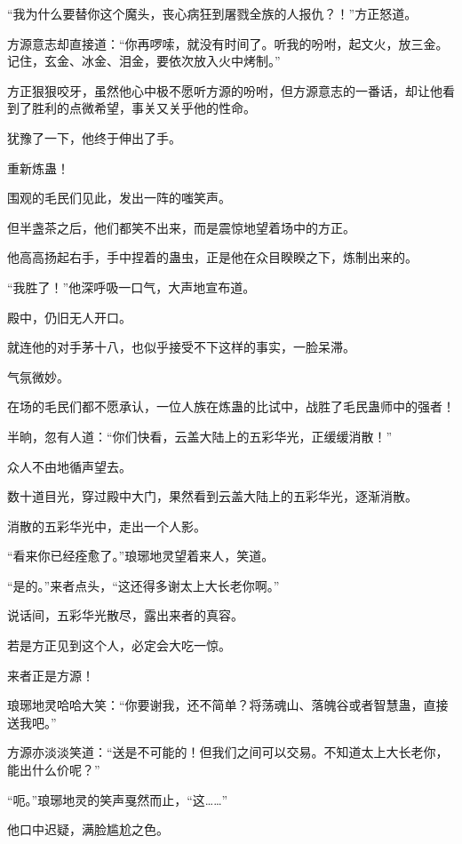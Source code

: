 \begin{this_body}
“我为什么要替你这个魔头，丧心病狂到屠戮全族的人报仇？！”方正怒道。

方源意志却直接道：“你再啰嗦，就没有时间了。听我的吩咐，起文火，放三金。记住，玄金、冰金、泪金，要依次放入火中烤制。”

方正狠狠咬牙，虽然他心中极不愿听方源的吩咐，但方源意志的一番话，却让他看到了胜利的点微希望，事关又关乎他的性命。

犹豫了一下，他终于伸出了手。

重新炼蛊！

围观的毛民们见此，发出一阵的嗤笑声。

但半盏茶之后，他们都笑不出来，而是震惊地望着场中的方正。

他高高扬起右手，手中捏着的蛊虫，正是他在众目睽睽之下，炼制出来的。

“我胜了！”他深呼吸一口气，大声地宣布道。

殿中，仍旧无人开口。

就连他的对手茅十八，也似乎接受不下这样的事实，一脸呆滞。

气氛微妙。

在场的毛民们都不愿承认，一位人族在炼蛊的比试中，战胜了毛民蛊师中的强者！

半晌，忽有人道：“你们快看，云盖大陆上的五彩华光，正缓缓消散！”

众人不由地循声望去。

数十道目光，穿过殿中大门，果然看到云盖大陆上的五彩华光，逐渐消散。

消散的五彩华光中，走出一个人影。

“看来你已经痊愈了。”琅琊地灵望着来人，笑道。

“是的。”来者点头，“这还得多谢太上大长老你啊。”

说话间，五彩华光散尽，露出来者的真容。

若是方正见到这个人，必定会大吃一惊。

来者正是方源！

琅琊地灵哈哈大笑：“你要谢我，还不简单？将荡魂山、落魄谷或者智慧蛊，直接送我吧。”

方源亦淡淡笑道：“送是不可能的！但我们之间可以交易。不知道太上大长老你，能出什么价呢？”

“呃。”琅琊地灵的笑声戛然而止，“这……”

他口中迟疑，满脸尴尬之色。

\end{this_body}

